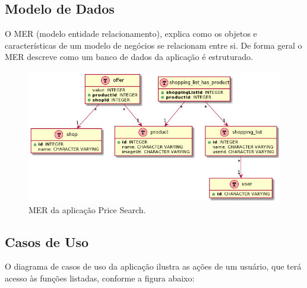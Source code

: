 \subsection{Modelo de Dados}
 
 O MER (modelo entidade relacionamento), explica como os objetos e características de um modelo de negócios se relacionam entre si. De forma geral o MER descreve como um banco de dados da aplicação é estruturado.
 
 
\begin{figure}[!htb]
\centering
\includegraphics[width=\linewidth]{figuras/MER.png}
\caption{MER da aplicação Price Search.}
\end{figure}
 
  
 
 \subsection{Casos de Uso}
O diagrama de casos de uso da aplicação ilustra as ações de um usuário, que terá acesso às funções listadas, conforme a figura abaixo:

